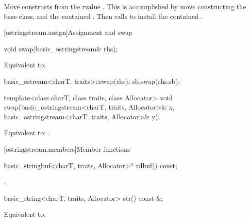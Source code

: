 \begin{itemdescr}
\pnum
\effects
Move constructs from the rvalue . This
is accomplished by move constructing the base class, and the contained
.
Then calls 
to install the contained .
\end{itemdescr}

[ostringstream.assign]{Assignment and swap}

%
\begin{itemdecl}
void swap(basic_ostringstream& rhs);
\end{itemdecl}

\begin{itemdescr}
\pnum
\effects
Equivalent to:
\begin{codeblock}
basic_ostream<charT, traits>::swap(rhs);
sb.swap(rhs.sb);
\end{codeblock}
\end{itemdescr}

%
\begin{itemdecl}
template<class charT, class traits, class Allocator>
  void swap(basic_ostringstream<charT, traits, Allocator>& x,
            basic_ostringstream<charT, traits, Allocator>& y);
\end{itemdecl}

\begin{itemdescr}
\pnum
\effects
Equivalent to: .
\end{itemdescr}

[ostringstream.members]{Member functions}

%
\begin{itemdecl}
basic_stringbuf<charT, traits, Allocator>* rdbuf() const;
\end{itemdecl}

\begin{itemdescr}
\pnum
\returns
{}.
\end{itemdescr}

%
\begin{itemdecl}
basic_string<charT, traits, Allocator> str() const &;
\end{itemdecl}

\begin{itemdescr}
\pnum
\effects
Equivalent to: 
\end{itemdescr}

